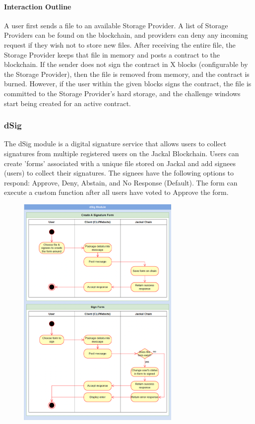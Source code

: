 \documentclass[a4paper]{article}
\begin{document}
\paragraph{Interaction Outline}
A user first sends a file to an available Storage Provider. A list of Storage Providers can be found on the blockchain, and providers can deny any incoming request if they wish not to store new files. After receiving the entire file, the Storage Provider keeps that file in memory and posts a contract to the blockchain. If the sender does not sign the contract in X blocks (configurable by the Storage Provider), then the file is removed from memory, and the contract is burned. However, if the user within the given blocks signs the contract, the file is committed to the Storage Provider's hard storage, and the challenge windows start being created for an active contract.

\subsubsection{dSig}
The dSig module is a digital signature service that allows users to collect signatures from multiple registered users on the Jackal Blockchain. Users can create 'forms' associated with a unique file stored on Jackal and add signees (users) to collect their signatures. The signees have the following options to respond: Approve, Deny, Abstain, and No Response (Default). The form can execute a custom function after all users have voted to Approve the form.

\begin{figure}[!htbp]
\centering
\includegraphics[width=0.7\textwidth]{assets/dsig.png}
\caption{}
\end{figure}
\end{document}
